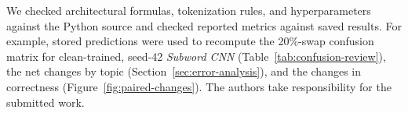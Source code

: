 We checked architectural formulas, tokenization rules, and hyperparameters against the Python source and checked reported metrics against saved results. For example, stored predictions were used to recompute the 20\%-swap confusion matrix for clean-trained, seed-42 \textit{Subword CNN} (Table~\ref{tab:confusion-review}), the net changes by topic (Section~\ref{sec:error-analysis}), and the changes in correctness (Figure~\ref{fig:paired-changes}). The authors take responsibility for the submitted work.
